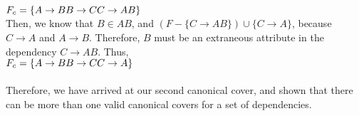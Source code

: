 \documentclass[a4 paper]{article}
\begin{document}
$F_c=\{\\
A\rightarrow B\\
B\rightarrow C\\
C\rightarrow AB\}$\\
Then, we know that $B\in AB$, and $(F-\{C\rightarrow AB\})\cup\{C\rightarrow A\}$, because $C\rightarrow A$ and $A\rightarrow B$. Therefore, $B$ must be an extraneous attribute in the dependency $C\rightarrow AB$. Thus,\\
$F_c=\{\\
A\rightarrow B\\
B\rightarrow C\\
C\rightarrow A\}$\\\\
Therefore, we have arrived at our second canonical cover, and shown that there can be more than one valid canonical covers for a set of dependencies.



\end{document}
